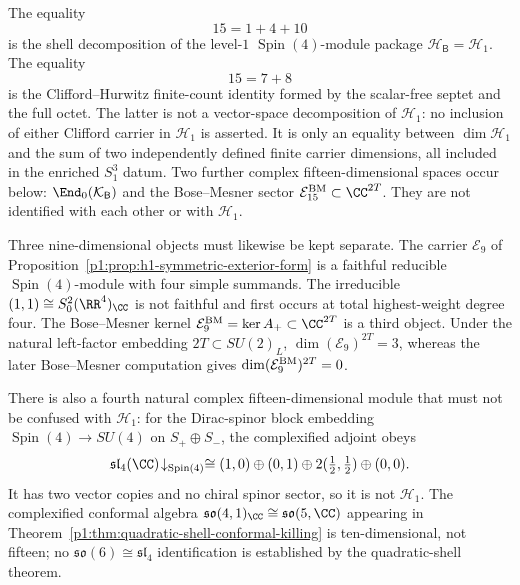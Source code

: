 \documentclass[11pt]{article}
\begin{document}
\begin{remark}
\label{p1:rem:s3one-two-fifteens}
The equality
\[
    15=1+4+10
\]
is the shell decomposition of the level-\(1\) \(\operatorname{Spin}(4)\)-module package
\(\mathcal H_{\mathsf B}=\mathcal H_1\).  The equality
\[
    15=7+8
\]
is the Clifford--Hurwitz finite-count identity formed by the scalar-free
septet and the full octet.  The latter is not a vector-space decomposition of
\(\mathcal H_1\): no inclusion of either Clifford carrier in \(\mathcal H_1\)
is asserted.  It is only an equality between \(\dim\mathcal H_1\) and the sum
of two independently defined finite carrier dimensions, all included in the
enriched \(S^3_1\) datum.
Two further complex fifteen-dimensional spaces occur below:
\(\End_0(\mathcal K_{\mathsf B})\) and the Bose--Mesner sector
\(\mathcal E_{15}^{\rm BM}\subset\CC^{2T}\).  They are not identified with
each other or with \(\mathcal H_1\).


Three nine-dimensional objects must likewise be kept separate.  The carrier
\(\mathcal E_9\) of Proposition~\ref{p1:prop:h1-symmetric-exterior-form} is a
faithful reducible \(\operatorname{Spin}(4)\)-module with four simple summands.  The
irreducible \((1,1)\cong S^2_0(\RR^4)_\CC\) is not faithful and first occurs
at total highest-weight degree four.  The Bose--Mesner kernel
\(\mathcal E_9^{\rm BM}=\ker A_+\subset\CC^{2T}\) is a third object.  Under
the natural left-factor embedding \(2T\subset SU(2)_L\),
\(\dim(\mathcal E_9)^{2T}=3\), whereas the later Bose--Mesner computation
gives \(\dim(\mathcal E_9^{\rm BM})^{2T}=0\).

There is also a fourth natural complex fifteen-dimensional module that must
not be confused with \(\mathcal H_1\): for the Dirac-spinor block embedding
\(\operatorname{Spin}(4)\to SU(4)\) on \(S_+\oplus S_-\), the complexified adjoint obeys
\[
 \mathfrak{sl}_4(\CC)\!\downarrow_{\operatorname{Spin}(4)}
 \cong
 (1,0)\oplus(0,1)\oplus2(\tfrac12,\tfrac12)\oplus(0,0).
\]
It has two vector copies and no chiral spinor sector, so it is not
\(\mathcal H_1\).  The complexified conformal algebra
\(\mathfrak{so}(4,1)_\CC\cong\mathfrak{so}(5,\CC)\) appearing in
Theorem~\ref{p1:thm:quadratic-shell-conformal-killing} is ten-dimensional,
not fifteen; no \(\mathfrak{so}(6)\cong\mathfrak{sl}_4\) identification is
established by the quadratic-shell theorem.
\end{remark}
\end{document}
